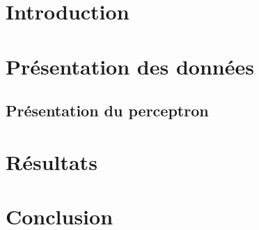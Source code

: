 \documentclass{article}
\begin{document}
\section{Introduction}
\section{Présentation des données}


\subsection{Présentation du perceptron}
\section{Résultats}



\section{Conclusion}
\end{document}
